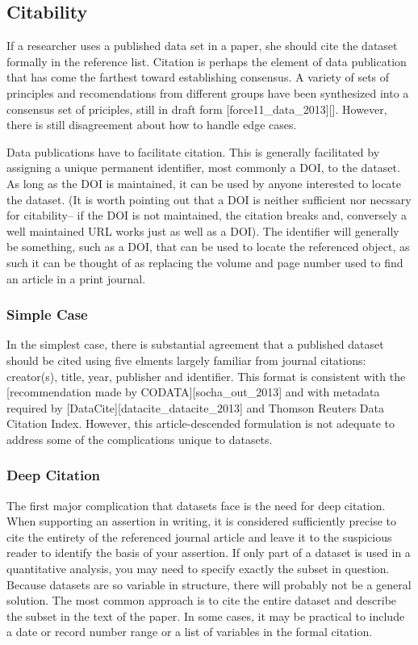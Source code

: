 \documentclass[10pt,a4paper,twocolumn]{article}
\begin{document}
\subsection*{Citability}\label{citability}

If a researcher uses a published data set in a paper, she should cite the dataset formally in the reference list. 
Citation is perhaps the element of data publication that has come the farthest toward establishing consensus.
A variety of sets of principles and recomendations from different groups have been synthesized into a consensus set of priciples, still in draft form {[}force11\_data\_2013{]}{[}{]}. 
However, there is still disagreement about how to handle edge cases.

Data publications have to facilitate citation. 
This is generally facilitated by assigning a unique permanent identifier, most commonly a DOI, to the dataset. 
As long as the DOI is maintained, it can be used by anyone interested to locate the dataset. 
(It is worth pointing out that a DOI is neither sufficient nor necssary for citability-- if the DOI is not maintained, the citation breaks and, conversely a well maintained URL works just as well as a DOI). 
The identifier will generally be something, such as a DOI, that can be used to locate the referenced object, as such it can be thought of as replacing the volume and page number used to find an article in a print journal.

\subsubsection{Simple Case}\label{simple-case}

In the simplest case, there is substantial agreement that a published dataset should be cited using five elments largely familiar from journal citations: creator(s), title, year, publisher and identifier. 
This format is consistent with the {[}recommendation made by CODATA{]}{[}socha\_out\_2013{]} and with metadata required by {[}DataCite{]}{[}datacite\_datacite\_2013{]} and Thomson Reuters Data Citation Index. However, this article-descended formulation is not adequate to address some of the complications unique to datasets.

\subsubsection{Deep Citation}\label{deep-citation}

The first major complication that datasets face is the need for deep citation. 
When supporting an assertion in writing, it is considered sufficiently precise to cite the entirety of the referenced journal article and leave it to the suspicious reader to identify the basis of your assertion. 
If only part of a dataset is used in a quantitative analysis, you may need to specify exactly the subset in question. 
Because datasets are so variable in structure, there will probably not be a general solution. 
The most common approach is to cite the entire dataset and describe the subset in the text of the paper. 
In some cases, it may be practical to include a date or record number range or a list of variables in the formal citation.
\end{document}
